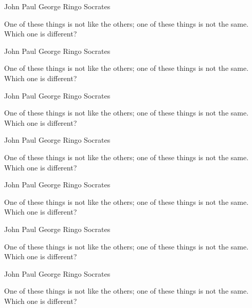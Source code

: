 \documentclass[answers,addpoints]{exam}
\begin{document}
\begin{questions}
\begin{randomizeoneparcheckboxes}[nokeeplast]
\choice John
\choice Paul
\choice George
\choice Ringo
\CorrectChoice Socrates
\end{randomizeoneparcheckboxes}

\question[5]
One of these things is not like the others; one of these
things is not the same. Which one is different?

\begin{oneparcheckboxes}%
\choice John
\choice Paul
\choice George
\choice Ringo
\CorrectChoice Socrates
\end{oneparcheckboxes}

\question[5]
One of these things is not like the others; one of these
things is not the same. Which one is different?

\begin{randomizeoneparchoices}
\choice John
\choice Paul
\choice George
\choice Ringo
\CorrectChoice Socrates
\end{randomizeoneparchoices}

\question[5]
One of these things is not like the others; one of these
things is not the same. Which one is different?

\begin{randomizeoneparchoices}
\choice John
\choice Paul
\choice George
\choice Ringo
\CorrectChoice Socrates
\end{randomizeoneparchoices}
\question[5]
One of these things is not like the others; one of these
things is not the same. Which one is different?

\begin{randomizeoneparchoices}
\choice John
\choice Paul
\choice George
\choice Ringo
\CorrectChoice Socrates
\end{randomizeoneparchoices}
\question[5]
One of these things is not like the others; one of these
things is not the same. Which one is different?

\begin{randomizeoneparchoices}
\choice John
\choice Paul
\choice George
\choice Ringo
\CorrectChoice Socrates
\end{randomizeoneparchoices}
\question[5]
One of these things is not like the others; one of these
things is not the same. Which one is different?

\begin{randomizeoneparchoices}
\choice John
\choice Paul
\choice George
\choice Ringo
\CorrectChoice Socrates
\end{randomizeoneparchoices}
\question[5]
One of these things is not like the others; one of these
things is not the same. Which one is different?


\end{questions}
\end{document}
